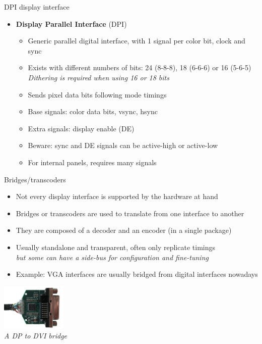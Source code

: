 \begin{frame}{DPI display interface}
  \begin{itemize}
  \item \textbf{Display Parallel Interface} (DPI)
    \begin{itemize}
    \item Generic parallel digital interface, with 1 signal per color bit, clock and sync
    \item Exists with different numbers of bits: 24 (8-8-8), 18 (6-6-6) or 16 (5-6-5)\\
    \textit{Dithering is required when using 16 or 18 bits}
    \item Sends pixel data bits following mode timings
    \item Base signals: color data bits, vsync, hsync
    \item Extra signals: display enable (DE)
    \item Beware: sync and DE signals can be active-high or active-low
    \item For internal panels, requires many signals
    \end{itemize}
  \end{itemize}
\end{frame}

\begin{frame}{Bridges/transcoders}
  \begin{itemize}
  \item Not every display interface is supported by the hardware at hand
  \item Bridges or transcoders are used to translate from one interface to another
  \item They are composed of a decoder and an encoder (in a single package)
  \item Usually standalone and transparent, often only replicate timings\\
  \textit{but some can have a side-bus for configuration and fine-tuning}
  \item Example: VGA interfaces are usually bridged from digital interfaces nowadays
  \end{itemize}

  \begin{center}
  \includegraphics[height=6em]{slides/graphics-hardware/dp-dvi-bridge.jpg}\\
  \textit{\small A DP to DVI bridge}
  \end{center}
\end{frame}

